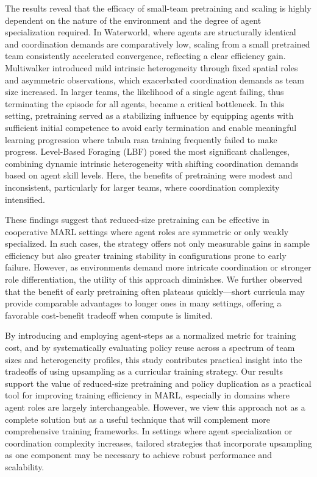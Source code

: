 \documentclass{article}
\begin{document}
The results reveal that the efficacy of small-team pretraining and scaling is highly dependent 
on the nature of the environment and the degree of agent specialization required. 
In Waterworld, 
where agents are structurally identical and coordination demands are comparatively low, 
scaling from a small pretrained team consistently accelerated convergence, 
reflecting a clear efficiency gain. 
Multiwalker introduced mild intrinsic heterogeneity through fixed spatial roles and 
asymmetric observations, which exacerbated coordination demands as team size increased. 
In larger teams, the likelihood of a single agent failing, thus terminating the episode 
for all agents, became a critical bottleneck. In this setting, pretraining served as a 
stabilizing influence by equipping agents with sufficient initial competence to avoid 
early termination and enable meaningful learning progression where tabula rasa training 
frequently failed to make progress.
Level-Based Foraging (LBF) posed the most significant challenges, 
combining dynamic intrinsic heterogeneity with shifting coordination 
demands based on agent skill levels. 
Here, the benefits of pretraining were modest and inconsistent, 
particularly for larger teams, where coordination complexity intensified.

These findings suggest that reduced-size pretraining can be effective in cooperative MARL 
settings where agent roles are symmetric or only weakly specialized. In such cases, 
the strategy offers not only measurable gains in sample efficiency but also greater 
training stability in configurations prone to early failure. However, as environments 
demand more intricate coordination or stronger role differentiation, the utility of 
this approach diminishes. We further observed that the benefit of early pretraining 
often plateaus quickly—short curricula may provide comparable advantages to longer 
ones in many settings, offering a favorable cost-benefit tradeoff when compute is limited.

By introducing and employing agent-steps as a normalized metric for training cost, and by 
systematically evaluating policy reuse across a spectrum of team sizes and heterogeneity 
profiles, this study contributes practical insight into the tradeoffs of using upsampling 
as a curricular training strategy. Our results support the value of reduced-size pretraining 
and policy duplication as a practical tool for improving training efficiency in MARL, 
especially in domains where agent roles are largely interchangeable. However, we view 
this approach not as a complete solution but as a useful technique that will complement 
more comprehensive training frameworks. In settings where agent specialization or 
coordination complexity increases, tailored strategies that incorporate upsampling as 
one component may be necessary to achieve robust performance and scalability.
\end{document}
